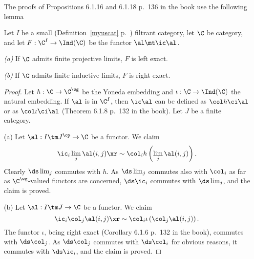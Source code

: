 \documentclass[12pt]{article}
\theoremstyle{remark}
\theoremstyle{definition}
\begin{document}


\begin{s} 
The proofs of Propositions 6.1.16 and 6.1.18 p.~136 in the book use the following lemma

\begin{lem} 
Let $I$ be a small (Definition~\ref{myuscat} p.~) filtrant category, let $\C$ be category, and let $F:\C^I\to\Ind(\C)$ be the functor $\al\mt\ic\al$. 

\nn\emph{(a)} If $\C$ admits finite projective limits, $F$ is left exact.  

\nn\emph{(b)} If $\C$ admits finite inductive limits, $F$ is right exact. 
\end{lem} 

\begin{proof} 
Let $h:\C\to\C^\wg$ be the Yoneda embedding and $\iota:\C\to\Ind(\C)$ the natural embedding. If $\al$ is in $\C^I$, then $\ic\al$ can be defined as $\col h\ci\al$ or as $\col\iota\ci\al$ (Theorem 6.1.8 p.~132 in the book). Let $J$ be a finite category. 

\nn(a) Let $\al:I\tm J^{\op}\to\C$ be a functor. We claim 
$$
\ic_i\lim_j\al(i,j)\xr\sim\col_i h\left(\lim_j\al(i,j)\right). 
$$ 
Clearly $\ds\lim_j$ commutes with $h$. As $\ds\lim_j$ commutes also with $\col_i$ as far as $\C^\wg$-valued functors are concerned, $\ds\ic_i$ commutes with $\ds\lim_j$, and the claim is proved. 

\nn(b) Let $\al:I\tm J\to\C$ be a functor. We claim 
$$
\ic_i\col_j\al(i,j)\xr\sim\col_i\iota\left(\col_j\al(i,j)\right). 
$$ 
The functor $\iota$, being right exact (Corollary 6.1.6 p.~132 in the book), commutes with $\ds\col_j$. As $\ds\col_j$ commutes with $\ds\col_i$ for obvious reasons, it commutes with $\ds\ic_i$, and the claim is proved.
\end{proof} 

\end{s} 

%
\end{document}
